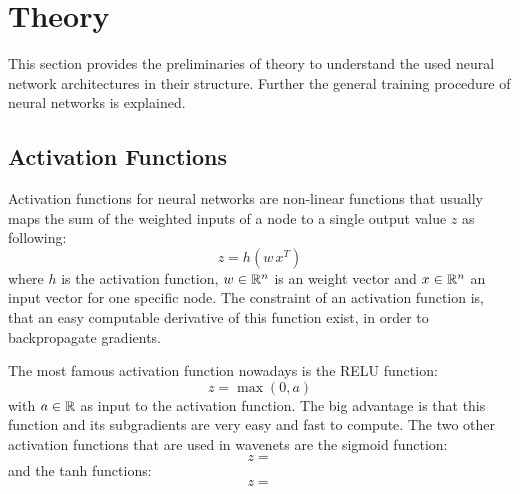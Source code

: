
\section{Theory}\label{sec:nn_theory}
\thesisStateNotReady
This section provides the preliminaries of theory to understand the used neural network architectures in their structure. 
Further the general training procedure of neural networks is explained.


\subsection{Activation Functions}\label{sec:nn_theory_acti}
Activation functions for neural networks are non-linear functions that usually maps the sum of the weighted inputs of a node to a single output value $z$ as following:
\begin{equation}\label{eq:nn_theory_acti}
  z = h(w \, x^T)
\end{equation}
where $h$ is the activation function, $w \in \mathbb{R}^n$ is an weight vector and $x \in \mathbb{R}^n$ an input vector for one specific node.
The constraint of an activation function is, that an easy computable derivative of this function exist, in order to backpropagate gradients.

The most famous activation function nowadays is the RELU function:
\begin{equation}\label{eq:nn_theory_relu}
  z = \max{(0, a)}
\end{equation}
with $a \in \mathbb{R}$ as input to the activation function.
The big advantage is that this function and its subgradients are very easy and fast to compute.
The two other activation functions that are used in wavenets are the sigmoid function:
\begin{equation}\label{eq:nn_theory_sigmoid}
  z = 
\end{equation}
and the tanh functions:
\begin{equation}\label{eq:nn_theory_tanh}
  z = 
\end{equation}



